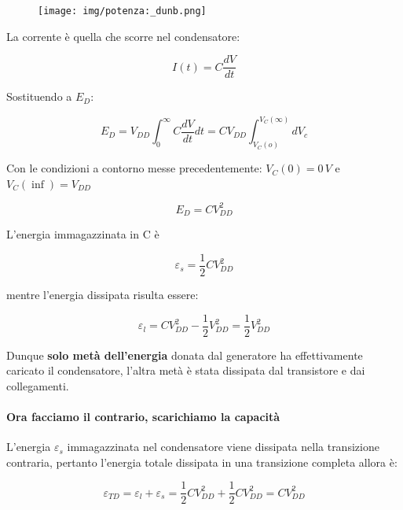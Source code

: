 \begin{figure}[htbp]
    \centering
    \texttt{[image: img/potenza:\_dunb.png]}
    
    
\end{figure}

La	corrente è quella che scorre nel condensatore:

\begin{equation*}
    I(t) = C\frac{dV}{dt}
\end{equation*}

Sostituendo a $E_D$:

\begin{equation*}
    E_D = V_{DD} \int_0^\infty C\frac{dV}{dt}dt = CV_{DD} \int_{V_C(o)}^{V_C(\infty)} dV_c
\end{equation*}

Con le condizioni a contorno messe precedentemente: $V_C(0) = 0\,V$ e $V_C(\inf) = V_{DD}$

\begin{equation*}
    E_D = CV_{DD}^2
\end{equation*}

L'energia immagazzinata in C è

\begin{equation*}
    \varepsilon_s = \frac{1}{2}CV_{DD}^2
\end{equation*}

mentre l'energia dissipata risulta essere:

\begin{equation*}
    \varepsilon_l = CV_{DD}^2 - \frac{1}{2}V_{DD}^2 = \frac{1}{2}V_{DD}^2
\end{equation*}

Dunque \textbf{solo metà dell'energia} donata dal generatore ha effettivamente caricato il condensatore, l'altra metà è stata dissipata dal transistore e dai collegamenti.

\newpage
\paragraph{Ora facciamo il contrario, scarichiamo la capacità}

L'energia	$\varepsilon_s $ immagazzinata nel condensatore viene dissipata nella transizione contraria, pertanto l'energia totale dissipata in una transizione completa allora è:


\begin{equation*}
    \varepsilon_{TD} = \varepsilon_l  + \varepsilon_s = \frac{1}{2}CV_{DD}^2 + \frac{1}{2}CV_{DD}^2 = CV_{DD}^2
\end{equation*}

